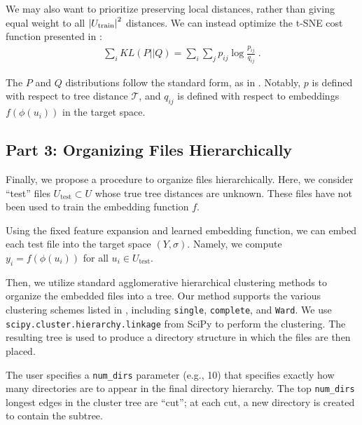 \documentclass{article}
\begin{document}
We may also want to prioritize preserving local distances, rather than giving equal weight to all $\abs{U_\text{train}}^2$ distances. We can instead optimize the t-SNE cost function presented in \cite{maaten2008visualizing}:
\begin{align}
  \sum_i KL(P||Q) = \sum_i \sum_j p_{ij} \log \frac{p_{ij}}{q_{ij}} \; .
  \label{eq:tsne-cost}
\end{align}

The $P$ and $Q$ distributions follow the standard form, as in \cite{maaten2008visualizing}. Notably, $p$ is defined with respect to tree distance $\mathcal T$, and $q_{ij}$ is defined with respect to embeddings $f(\phi(u_i))$ in the target space.

\subsection{Part 3: Organizing Files Hierarchically}

Finally, we propose a procedure to organize files hierarchically. Here, we consider ``test'' files $U_\text{test} \subset U$ whose true tree distances are unknown. These files have not been used to train the embedding function $f$.

Using the fixed feature expansion and learned embedding function, we can embed each test file into the target space $(Y, \sigma)$. Namely, we compute $y_i = f(\phi(u_i))$ for all $u_i \in U_\text{test}$.

Then, we utilize standard agglomerative hierarchical clustering methods to organize the embedded files into a tree. Our method supports the various clustering schemes listed in \cite{müllner2011modernhierarchicalagglomerativeclustering}, including \texttt{single}, \texttt{complete}, and \texttt{Ward}. We use \texttt{scipy.cluster.hierarchy.linkage} from SciPy to perform the clustering. The resulting tree is used to produce a directory structure in which the files are then placed.

The user specifies a \texttt{num\_dirs} parameter (e.g., 10) that specifies exactly how many directories are to appear in the final directory hierarchy. The top \texttt{num\_dirs} longest edges in the cluster tree are ``cut''; at each cut, a new directory is created to contain the subtree.
\end{document}
